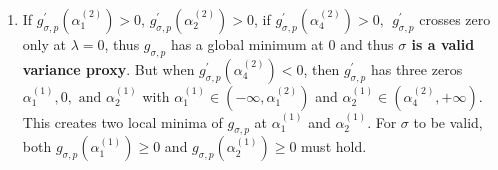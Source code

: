\documentclass[a4paper, 10pt]{article}
\theoremstyle{definition}
\begin{document}
\begin{itemize}
\begin{itemize}
    \begin{enumerate}
        \item If $g_{\sigma, p}^{'}(\alpha_1^{(2)}) > 0$, $g_{\sigma, p}^{'}(\alpha_2^{(2)}) > 0$, if $g_{\sigma, p}^{'}(\alpha_4^{(2)}) > 0, \ \ g_{\sigma, p}^{'}$ crosses zero only at $\lambda=0$, thus $g_{\sigma, p}$ has a global minimum at 0 and thus \textbf{$\sigma$ is a valid variance proxy}.  But when $g_{\sigma, p}^{'}(\alpha_4^{(2)}) < 0$, then $g_{\sigma, p}^{'}$ has three zeros $\alpha_1^{(1)}, 0, \text{ and } \alpha_2^{(1)}$ with $\alpha_1^{(1)} \in (-\infty, \alpha_1^{(2)})$ and $\alpha_2^{(1)} \in (\alpha_4^{(2)}, +\infty)$. This creates two local minima of $g_{\sigma, p}$ at $\alpha_1^{(1)}$ and $\alpha_2^{(1)}$. For $\sigma$ to be valid, both $g_{\sigma, p}(\alpha_1^{(1)}) \geq 0$ and $g_{\sigma, p}(\alpha_2^{(1)}) \geq 0$ must hold.
    

\end{enumerate}
\end{itemize}
\end{itemize}
\end{document}
